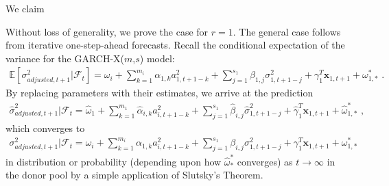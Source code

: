 \documentclass[11pt]{article}
\newcommand{\x}{\textbf{x}}
\def\E{\mathbb{E}} %
\theoremstyle{definition}
\newenvironment{proof-of-proposition}[1][{}]{\noindent{\bf
    Proof of Proposition {#1}}
  \hspace*{.5em}}{\qed\bigskip\\}
\begin{document}
  \begin{proof-of-proposition}[\ref{ARIMA_conv_distribution}]
    We claim

    Without loss of generality, we prove the case for $r = 1$.  The general case follows from iterative one-step-ahead forecasts.  Recall the conditional expectation of the variance for the GARCH-X($m$,$s$) model:
    \begin{align*}
    \E[\sigma^{2}_{adjusted,t+1}|\mathcal{F}_{t}] = \omega_{i} +  \sum^{m_{i}}_{k=1}\alpha_{1,k}a^{2}_{1,t+1-k} + \sum_{j=1}^{s_{1}}\beta_{1,j}\sigma_{1,t+1-j}^{2} + \gamma_{1}^{T} \x_{1,t+1} + \omega^{*}_{1,*} \text{ .}
    \end{align*}
    By replacing parameters with their estimates, we arrive at the prediction 
    \begin{align*}
    \hat\sigma^{2}_{adjusted,t+1}|\mathcal{F}_{t} = \hat\omega_{1} + \sum^{m_{1}}_{k=1}\hat\alpha_{i,k}a^{2}_{i,t+1-k} + \sum_{j=1}^{s_{1}}\hat\beta_{i,j}\hat\sigma_{1,t+1-j}^{2} + \hat\gamma_{1}^{T} \x_{1,t+1} + \hat\omega^{*}_{1,*}\text { ,}
    \end{align*}
    which converges to 
    \begin{align*}
      \sigma^{2}_{adjusted,t+1}|\mathcal{F}_{t} = \omega_{i} + \sum^{m_{i}}_{k=1}\alpha_{1,k}a^{2}_{i,t+1-k} + \sum_{j=1}^{s_{1}}\beta_{i,j}\sigma_{1,t+1-j}^{2} + \gamma_{1}^{T} \x_{1,t+1} + \omega^{*}_{1,*}
      \end{align*}
    in distribution or probability (depending upon how $\hat\omega^{*}_{*}$ converges) as $t\rightarrow\infty$ in the donor pool by a simple application of Slutsky's Theorem.
    
    \end{proof-of-proposition}
    
  
\clearpage


 
\end{document}
